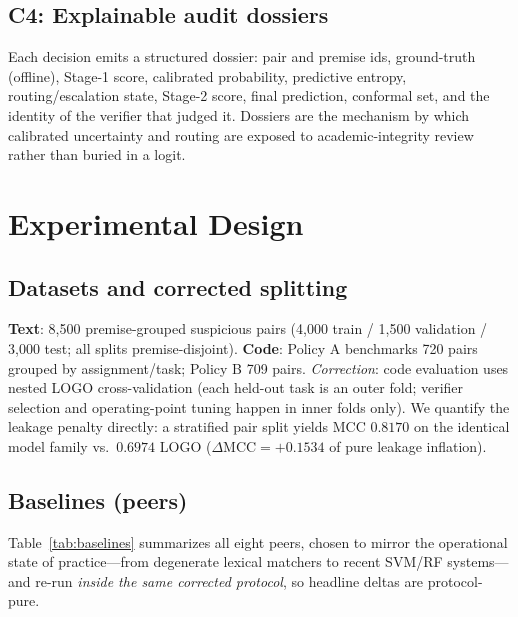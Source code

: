 \documentclass[conference]{IEEEtran}
\newcommand{\mcc}{\mathrm{MCC}}
\begin{document}
\subsection{C4: Explainable audit dossiers}
Each decision emits a structured dossier: pair and premise ids, ground-truth (offline), Stage-1
score, calibrated probability, predictive entropy, routing/escalation state, Stage-2 score, final
prediction, conformal set, and the identity of the verifier that judged it. Dossiers are the
mechanism by which calibrated uncertainty and routing are exposed to academic-integrity review
rather than buried in a logit.

\section{Experimental Design}
\label{sec:setup}

\subsection{Datasets and corrected splitting}
\textbf{Text}: 8{,}500 premise-grouped suspicious pairs (4{,}000 train / 1{,}500 validation /
3{,}000 test; all splits premise-disjoint). \textbf{Code}: Policy A benchmarks 720 pairs grouped by
assignment/task; Policy B 709 pairs. \emph{Correction}: code evaluation uses nested LOGO
cross-validation (each held-out task is an outer fold; verifier selection and operating-point
tuning happen in inner folds only). We quantify the leakage penalty directly: a stratified pair
split yields MCC $0.8170$ on the identical model family vs.\ $0.6974$ LOGO
($\Delta\mcc = +0.1534$ of pure leakage inflation).

\subsection{Baselines (peers)}
Table~\ref{tab:baselines} summarizes all eight peers, chosen to mirror the operational state of
practice---from degenerate lexical matchers to recent SVM/RF systems---and re-run \emph{inside the
same corrected protocol}, so headline deltas are protocol-pure.
\end{document}
